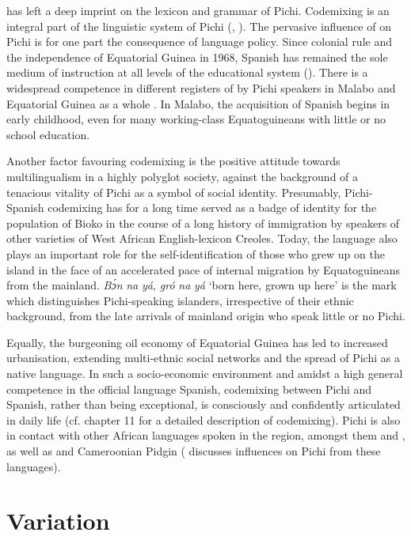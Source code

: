  has left a deep imprint on the lexicon and grammar of Pichi. Codemixing is an integral part of the linguistic system of Pichi (\citealt{Yakpo2009complexity}, \citealt{Yakpo2018}). The pervasive influence of  on Pichi is for one part the consequence of language policy. Since colonial rule and the independence of Equatorial Guinea in 1968, Spanish has remained the sole medium of instruction at all levels of the educational system (\citealt[35–36]{Lipski1992}). There is a widespread competence in different registers of  by Pichi speakers in Malabo and Equatorial Guinea as a whole \citep{Lipski1985,García2016}. In Malabo, the acquisition of Spanish begins in early childhood, even for many working-class Equatoguineans with little or no school education. 

Another factor favouring codemixing is the positive attitude towards multilingualism in a highly polyglot society, against the background of a tenacious vitality of Pichi as a symbol of social identity. Presumably, Pichi-Spanish codemixing has for a long time served as a badge of identity for the population of Bioko in the course of a long history of immigration by speakers of other varieties of West African English-lexicon Creoles. Today, the language also plays an important role for the self-identification of those who grew up on the island in the face of an accelerated pace of internal migration by Equatoguineans from the mainland. \textit{Bɔ́n} \textit{na} \textit{yá,} \textit{gró} \textit{na} \textit{yá} ‘born here, grown up here’ is the mark which distinguishes Pichi-speaking islanders, irrespective of their ethnic background, from the late arrivals of mainland origin who speak little or no Pichi. 

Equally, the burgeoning oil economy of Equatorial Guinea has led to increased urbanisation, extending multi-ethnic social networks and the spread of Pichi as a native language. In such a socio-economic environment and amidst a high general competence in the official language Spanish, codemixing between Pichi and Spanish, rather than being exceptional, is consciously and confidently articulated in daily life (cf. chapter 11 for a detailed description of codemixing). Pichi is also in contact with other African languages spoken in the region, amongst them  and , as well as  and Cameroonian Pidgin (\citealt{Yakpo2013} discusses influences on Pichi from these languages).

\section{Variation}\label{sec:1.3}

